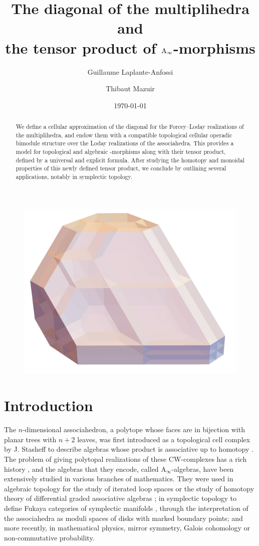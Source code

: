 \documentclass[twoside, 11pt]{amsart}
\title[The diagonal of the multiplihedra]{The diagonal of the multiplihedra and \\ the tensor product of $\mathrm{A}_\infty$-morphisms}
\author{Guillaume Laplante-Anfossi}
\author{Thibaut Mazuir}
\date{\today}
\theoremstyle{remark}
\begin{document}
\begin{abstract}
We define a cellular approximation of the diagonal for the Forcey--Loday realizations of the multiplihedra, and endow them with a compatible topological cellular operadic bimodule structure over the Loday realizations of the associahedra. 
This provides a model for topological and algebraic \Ainf -morphisms along with their tensor product, defined by a universal and explicit formula. 
After studying the homotopy and monoidal properties of this newly defined tensor product, we conclude by outlining several applications, notably in symplectic topology.
\end{abstract}

\maketitle

\begin{figure}[h!]
\centering
\includegraphics[width=0.6\linewidth]{J4.png} 
\label{Fig5:J4}
\end{figure}

\newpage

\setcounter{tocdepth}{1}
\tableofcontents


\section*{Introduction}

The $n$-dimensional associahedron, a polytope whose faces are in bijection with planar trees with $n+2$ leaves, was first introduced as a topological cell complex by J. Stasheff to describe algebras whose product is associative up to homotopy \cite{Stasheff63}.
The problem of giving polytopal realizations of these CW-complexes has a rich history \cite{CeballosZiegler12}, and the algebras that they encode, called $\mathrm{A}_\infty$-algebras, have been extensively studied in various branches of mathematics. They were used in algebraic topology for the study of iterated loop spaces \cite{May72} or the study of homotopy theory of differential graded associative algebras \cite{LefevreHasegawa03,Vallette14} ; in symplectic topology to define Fukaya categories of symplectic manifolds \cite{Seidel08,fo3-I,fo3-II}, through the interpretation of the associahedra as moduli spaces of disks with marked boundary points; and more recently, in mathematical physics, mirror symmetry, Galois cohomology or non-commutative probability.
\end{document}

